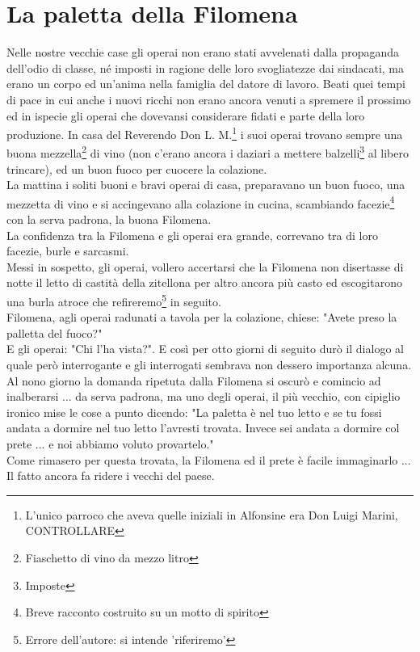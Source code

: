 \documentclass[10pt]{memoir} %
\begin{document}
\chapter{La paletta della Filomena}
Nelle nostre vecchie case gli operai non erano stati avvelenati dalla propaganda dell'odio di classe, né imposti in ragione delle loro svogliatezze dai sindacati, ma erano un corpo ed un'anima nella famiglia del datore di lavoro. Beati quei tempi di pace in cui anche i nuovi ricchi non erano ancora venuti a spremere il prossimo ed in ispecie gli operai che dovevansi considerare fidati e parte della loro produzione. In casa del Reverendo Don L. M.\footnote{L'unico parroco che aveva quelle iniziali in Alfonsine era Don Luigi Marini, CONTROLLARE} i suoi operai trovano sempre una buona mezzella\footnote{Fiaschetto di vino da mezzo litro} di vino (non c'erano ancora i daziari a mettere balzelli\footnote{Imposte} al libero trincare), ed un buon fuoco per cuocere la colazione.\\
La mattina i soliti buoni e bravi operai di casa, preparavano un buon fuoco, una mezzetta di vino e si accingevano alla colazione in cucina, scambiando facezie\footnote{Breve racconto costruito su un motto di spirito} con la serva padrona, la buona Filomena.\\
La confidenza tra la Filomena e gli operai era grande, correvano tra di loro facezie, burle e sarcasmi. \\
Messi in sospetto, gli operai, vollero accertarsi che la Filomena non disertasse di notte il letto di castità della zitellona per altro ancora più casto ed escogitarono una burla atroce che refireremo\footnote{Errore dell'autore: si intende 'riferiremo'} in seguito. \\
Filomena, agli operai radunati a tavola per la colazione, chiese: "Avete preso la palletta del fuoco?"\\
E gli operai: "Chi l'ha vista?". E così per otto giorni di seguito durò il dialogo al quale però interrogante e gli interrogati sembrava non dessero importanza alcuna.\\
Al nono giorno la domanda ripetuta dalla Filomena si oscurò e comincio ad inalberarsi ... da serva padrona, ma uno degli operai, il più vecchio, con cipiglio ironico mise le cose a punto dicendo: "La paletta è nel tuo letto e se tu fossi andata a dormire nel tuo letto l'avresti trovata. Invece sei andata a dormire col prete ... e noi abbiamo voluto provartelo."\\
Come rimasero per questa trovata, la Filomena ed il prete è facile immaginarlo ... Il fatto ancora fa ridere i vecchi del paese.
\end{document}
